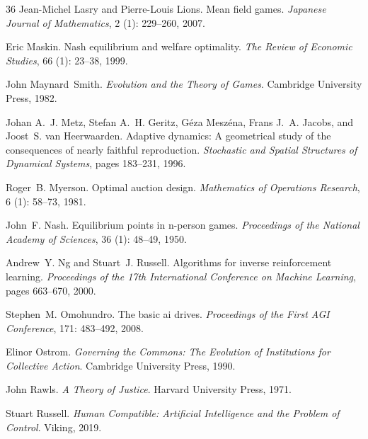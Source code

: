 \documentclass[12pt]{article}
\begin{document}
\begin{thebibliography}{36}
Jean-Michel Lasry and Pierre-Louis Lions.
\newblock Mean field games.
\newblock \emph{Japanese Journal of Mathematics}, 2 (1):
  229--260, 2007.

Eric Maskin.
\newblock Nash equilibrium and welfare optimality.
\newblock \emph{The Review of Economic Studies}, 66 (1):
  23--38, 1999.

John Maynard~Smith.
\newblock \emph{Evolution and the Theory of Games}.
\newblock Cambridge University Press, 1982.

Johan A.~J. Metz, Stefan A.~H. Geritz, G{\'e}za Mesz{\'e}na, Frans J.~A.
  Jacobs, and Joost~S. van Heerwaarden.
\newblock Adaptive dynamics: A geometrical study of the consequences of nearly
  faithful reproduction.
\newblock \emph{Stochastic and Spatial Structures of Dynamical Systems}, pages
  183--231, 1996.

Roger~B. Myerson.
\newblock Optimal auction design.
\newblock \emph{Mathematics of Operations Research}, 6 (1):
  58--73, 1981.

John~F. Nash.
\newblock Equilibrium points in n-person games.
\newblock \emph{Proceedings of the National Academy of Sciences}, 36
  (1): 48--49, 1950.

Andrew~Y. Ng and Stuart~J. Russell.
\newblock Algorithms for inverse reinforcement learning.
\newblock \emph{Proceedings of the 17th International Conference on Machine
  Learning}, pages 663--670, 2000.

Stephen~M. Omohundro.
\newblock The basic ai drives.
\newblock \emph{Proceedings of the First AGI Conference}, 171:
  483--492, 2008.

Elinor Ostrom.
\newblock \emph{Governing the Commons: The Evolution of Institutions for
  Collective Action}.
\newblock Cambridge University Press, 1990.

John Rawls.
\newblock \emph{A Theory of Justice}.
\newblock Harvard University Press, 1971.

Stuart Russell.
\newblock \emph{Human Compatible: Artificial Intelligence and the Problem of
  Control}.
\newblock Viking, 2019.


\end{thebibliography}
\end{document}
